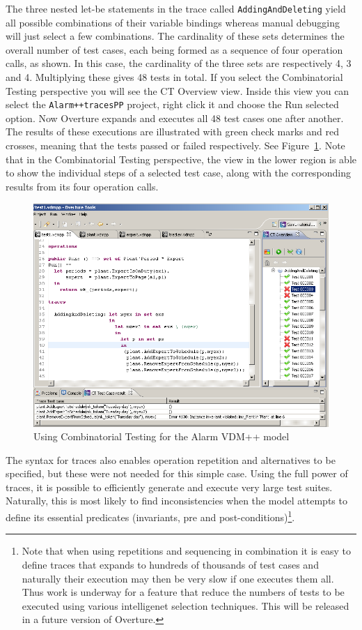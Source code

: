 \noindent The three nested let-be statements in the trace
called \texttt{AddingAndDeleting} yield all possible combinations of
their variable bindings whereas manual debugging will just select a
few combinations.  The cardinality of these sets determines the
overall number of test cases, each being formed as a sequence of four
operation calls, as shown. In this case, the cardinality of the three
sets are respectively 4, 3 and 4. Multiplying these gives 48 tests in total. If you
select the Combinatorial Testing perspective you will see the
\textsf{CT Overview} view. Inside this view you can select the \texttt{Alarm++tracesPP}
project, right click it and choose the \textsf{Run selected}
option. Now Overture expands and executes all 48 test cases one after
another. The results of these executions are illustrated with green
check marks and red crosses, meaning that the tests passed or failed
respectively. See Figure~\ref{fig:stracesalarm}. Note that in the
Combinatorial Testing perspective, the view in the lower region is
able to show the individual steps of a selected test case, along with
the corresponding results from its four operation calls.

\begin{figure}[htbp]
\begin{center}
\includegraphics[width=4.5in]{figures/tracesalarm}
\caption{Using Combinatorial Testing for the Alarm VDM++ model\label{fig:stracesalarm}}
\end{center}
\end{figure}

The syntax for traces also enables operation repetition and alternatives to be
specified, but these were not needed for this simple case. Using the full power
of traces, it is possible to efficiently generate and execute very large test
suites. Naturally, this is most likely to find inconsistencies when the model
attempts to define its essential predicates (invariants, pre and
post-conditions)\footnote{Note that when using repetitions and
  sequencing in combination it is easy to define traces that expands
  to hundreds of thousands of test cases and naturally their execution
  may then be very slow if one executes them all. Thus work is
  underway for a feature that reduce the numbers of tests to be
  executed using various intelligenet selection techniques. This will
  be released in a future version of Overture.}.

